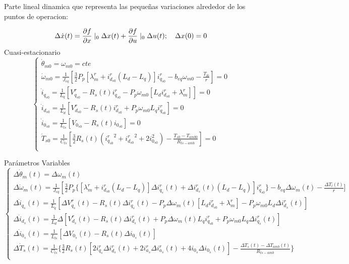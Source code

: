 \documentclass{article}
\begin{document}
Parte lineal dinamica que representa las pequeñas variaciones alrededor de los puntos de operacion:

\begin{equation}
    \Delta\dot{x}(t) = \frac{\partial f}{\partial x}\mid_{0}\Delta x(t) + \frac{\partial f}{\partial u}\mid_{0}\Delta u(t); \quad \Delta x(0) = 0\\
\end{equation}
Cuasi-estacionario
\begin{equation}
    \begin{cases}
        \dot{\theta}_{m0} = \omega_{m0} = cte\\
        \dot{\omega}_{m0} = \frac{1}{J_{eq}}[\frac{3}{2}P_{p}[\lambda_{m}^r+i_{d_{s0}}^r(L_{d}-L_{q})]i_{q_{s0}}^r - b_{eq}\omega_{m0} - \frac{T_{l0}}{r}] = 0\\
        \dot{i}_{q_{s0}} = \frac{1}{L_{q}}[V_{q_{s0}}^r - R_{s}(t)i_{q_{s0}}^r - P_{p}\omega_{m0}[L_{d}i_{d_{s0}}^r+\lambda_{m}^r]] = 0\\
        \dot{i}_{d_{s0}} = \frac{1}{L_{d}}[V_{d_{s0}}^r - R_{s}(t)i_{d_{s0}}^r + P_{p}\omega_{m0}L_{q}i_{q_{s0}}^r] = 0 \\
        \dot{i}_{0_{s0}} = \frac{1}{L_{ls}}[V_{0_{s0}} - R_{s}(t)i_{0_{s0}}] = 0\\
        \dot{T}_{s0} = \frac{1}{C_{ts}}[\frac{3}{2}R_{s}(t)({i_{q_{s0}}^r}^2+{i_{d_{s0}}^r}^2+2i_{0_{s0}}^2)-\frac{T_{s0}-T_{amb0}}{R_{ts-amb}}] = 0\\
    \end{cases}
\end{equation}

Parámetros Variables
\begin{equation}
    \begin{cases}
        \Delta\dot{\theta}_{m}(t) = \Delta\omega_{m}(t)\\
        \Delta\dot{\omega}_{m}(t) = \frac{1}{J_{eq}}[\frac{3}{2}P_{p}\{[\lambda_{m}^r + i_{d_{s0}}^r(L_{d}-L_{q})]\Delta i_{q_{s}}^r(t) + \Delta i_{d_{s}}^r(t)(L_{d}-L_{q})]i_{q_{s0}}^r\}- b_{eq}\Delta\omega_{m}(t) - \frac{\Delta T_{l}(t)}{r}]\\
        \Delta\dot{i}_{q_{s}}(t) = \frac{1}{L_{q}}[\Delta V_{q_{s}}^r(t) - R_{s}(t)\Delta i_{q_{s}}^r(t) - P_{p}\Delta\omega_{m}(t)[L_{d}i_{d_{s0}}^r+\lambda_{m}^r] - P_{p}\omega_{m0}L_{d}\Delta i_{d_{s}}^r(t)] \\
        \Delta\dot{i}_{d_{s}}(t) = \frac{1}{L_{d}}\Delta [V_{d_{s}}^r(t) - R_{s}(t)\Delta i_{d_{s}}^r(t) + P_{p}\Delta\omega_{m}(t)L_{q}i_{q_{s0}}^r + P_{p}\omega_{m0}L_{q}\Delta i_{q_{s}}^r(t)]  \\
        \Delta\dot{i}_{0_{s}}(t) = \frac{1}{L_{ls}}[\Delta V_{0_{s}}(t) - R_{s}(t)\Delta i_{0_{s}}(t)] \\
        \Delta\dot{T}_{s}(t) = \frac{1}{C_{ts}}\{\frac{3}{2}R_{s}(t)[{2i_{q_{s}}^r\Delta i_{d_{s}}^r(t)} + 2i_{a_{s}}^r\Delta i_{a_{s}}^r(t)+4i_{0_{s}}\Delta i_{0_{s}}(t)]-\frac{\Delta T_{s}(t)-\Delta T_{amb}(t)}{R_{ts-amb}}\}\\
    \end{cases}
\end{equation}
\end{document}
